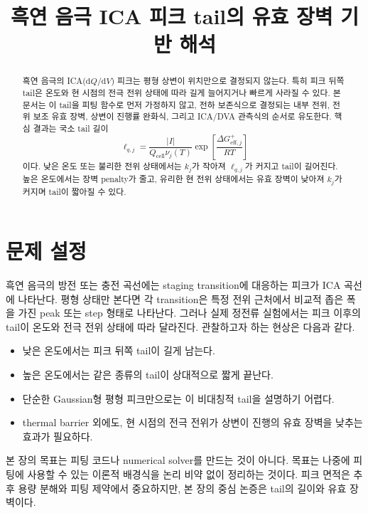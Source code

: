 \documentclass[11pt]{article}
\title{흑연 음극 ICA 피크 tail의 유효 장벽 기반 해석}
\author{}
\date{}
\newcommand{\dd}{\mathrm{d}}
\newcommand{\cell}{\mathrm{cell}}
\newcommand{\eff}{\mathrm{eff}}
\begin{document}
\maketitle

\begin{abstract}
흑연 음극의 ICA(\(\dd Q/\dd V\)) 피크는 평형 상변이 위치만으로 결정되지 않는다. 특히 피크 뒤쪽 tail은 온도와 현 시점의 전극 전위 상태에 따라 길게 늘어지거나 빠르게 사라질 수 있다. 본 문서는 이 tail을 피팅 함수로 먼저 가정하지 않고, 전하 보존식으로 결정되는 내부 전위, 전위 보조 유효 장벽, 상변이 진행률 완화식, 그리고 ICA/DVA 관측식의 순서로 유도한다. 핵심 결과는 국소 tail 길이
\begin{equation}
\ell_{q,j}
=
\frac{|I|}{Q_{\cell}\nu_j(T)}
\exp\!\left[
\frac{\Delta G_{\eff,j}^{+}}{RT}
\right]
\end{equation}
이다. 낮은 온도 또는 불리한 전위 상태에서는 \(k_j\)가 작아져 \(\ell_{q,j}\)가 커지고 tail이 길어진다. 높은 온도에서는 장벽 penalty가 줄고, 유리한 현 전위 상태에서는 유효 장벽이 낮아져 \(k_j\)가 커지며 tail이 짧아질 수 있다.
\end{abstract}

\section{문제 설정}

흑연 음극의 방전 또는 충전 곡선에는 staging transition에 대응하는 피크가 ICA 곡선에 나타난다. 평형 상태만 본다면 각 transition은 특정 전위 근처에서 비교적 좁은 폭을 가진 peak 또는 step 형태로 나타난다. 그러나 실제 정전류 실험에서는 피크 이후의 tail이 온도와 전극 전위 상태에 따라 달라진다. 관찰하고자 하는 현상은 다음과 같다.

\begin{itemize}
\item 낮은 온도에서는 피크 뒤쪽 tail이 길게 남는다.
\item 높은 온도에서는 같은 종류의 tail이 상대적으로 짧게 끝난다.
\item 단순한 Gaussian형 평형 피크만으로는 이 비대칭적 tail을 설명하기 어렵다.
\item thermal barrier 외에도, 현 시점의 전극 전위가 상변이 진행의 유효 장벽을 낮추는 효과가 필요하다.
\end{itemize}

본 장의 목표는 피팅 코드나 numerical solver를 만드는 것이 아니다. 목표는 나중에 피팅에 사용할 수 있는 이론적 배경식을 논리 비약 없이 정리하는 것이다. 피크 면적은 추후 용량 분해와 피팅 제약에서 중요하지만, 본 장의 중심 논증은 tail의 길이와 유효 장벽이다.
\end{document}

